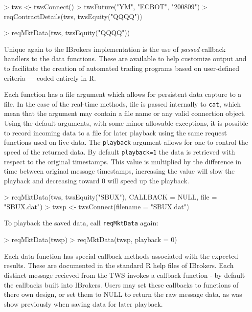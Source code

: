 \documentclass{article}
\begin{document}
\begin{Schunk}
\begin{Sinput}
> tws <- twsConnect()
> twsFuture("YM", "ECBOT", "200809")
> reqContractDetails(tws, twsEquity("QQQQ"))
\end{Sinput}
\end{Schunk}
\begin{Schunk}
\begin{Sinput}
> reqMktData(tws, twsEquity("QQQQ"))
\end{Sinput}
\end{Schunk}

Unique again to the IBrokers implementation is the
use of \emph{passed} callback handlers to the data functions. These are
available to help customize output and to facilitate the creation of
automated trading programs based on user-defined criteria ---
coded entirely in R.

Each function has a file argument which allows for persistent
data capture to a file.  In the case of the real-time methods,
file is passed internally to {\tt cat}, which mean that the
argument may contain a file name or any valid connection
object. Using the default arguments, with some minor allowable
exceptions, it is possible to record incoming data to a file
for later playback using the same request functions used on
live data. The {\tt playback} argument allows for one to control
the speed of the returned data. By default {\tt playback=1}
the data is retrieved with respect to the original timestamps.
This value is multiplied by the difference in time between
original message timestamps, increasing the value will slow the
playback and decreasing toward 0 will speed up the playback.

\begin{Schunk}
\begin{Sinput}
> reqMktData(tws, twsEquity("SBUX"), CALLBACK = NULL, file = "SBUX.dat")
> twsp <- twsConnect(filename = "SBUX.dat")
\end{Sinput}
\end{Schunk}
To playback the saved data, call {\tt reqMktData} again:
\begin{Schunk}
\begin{Sinput}
> reqMktData(twsp)
> reqMktData(twsp, playback = 0)
\end{Sinput}
\end{Schunk}

Each data function has special callback methods
associated with the expected results. These are documented
in the standard R help files of IBrokers.
Each distinct message recieved from the TWS
invokes a callback function - by default the callbacks
built into IBrokers. Users may set these callbacks to
functions of there own design, or set them to NULL to
return the raw message data, as was show previously when
saving data for later playback.
\end{document}
